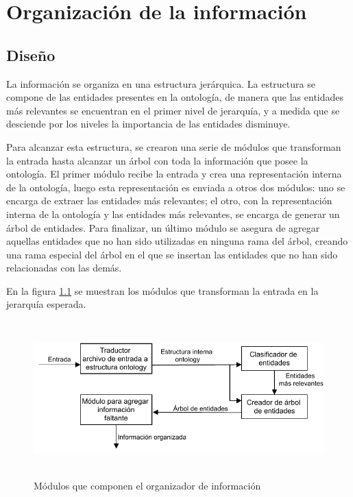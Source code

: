 \chapter{Organización de la información}

\section{Diseño}
La información se organiza en una estructura  jerárquica. La estructura se compone de las entidades presentes en la ontología, de manera que las entidades más relevantes se encuentran en el primer nivel de jerarquía, y a medida que se desciende por los niveles la importancia de las entidades disminuye.

Para alcanzar esta estructura, se crearon una serie de módulos que transforman la entrada hasta alcanzar un árbol con toda la información que posee la ontología. El primer módulo recibe la entrada y crea una representación interna de la ontología, luego esta representación es enviada a otros dos módulos: uno se encarga de extraer las entidades más relevantes; el otro, con la representación interna de la ontología y las entidades más relevantes, se encarga de generar un árbol de entidades. Para finalizar, un último módulo se asegura de agregar aquellas entidades que no han sido utilizadas en ninguna rama del árbol, creando una rama especial del árbol en el que se insertan las entidades que no han sido relacionadas con las demás.

En la figura \ref{fig:modulos_organizador_inf} se muestran los módulos que transforman la entrada en la jerarquía esperada.

\begin{figure}[H]
    \centering
    \includegraphics[width=12cm, height=6cm]{img/organizacion_informacion/modulos_organizador_de_informacion.pdf}
    \caption{Módulos que componen el organizador de información}
    \label{fig:modulos_organizador_inf}
\end{figure}

